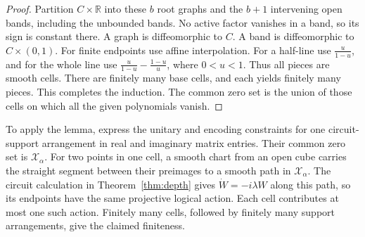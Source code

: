 \documentclass[aps,prl,reprint,notitlepage,nofootinbib,nobibnotes]{revtex4-2}
\begin{document}
\begin{proof}
Partition \(C\times\mathbb R\) into these \(b\) root graphs and the
\(b+1\) intervening open bands, including the unbounded bands.
No active factor vanishes in a band, so its sign is constant there.
A graph is diffeomorphic to \(C\). A band is diffeomorphic to
\(C\times(0,1)\). For finite endpoints use affine interpolation.
For a half-line use \(\frac{u}{1-u}\), and for the whole line use
\(\frac{u}{1-u}-\frac{1-u}{u}\), where \(0<u<1\).
Thus all pieces are smooth cells. There are finitely many base cells,
and each yields finitely many pieces. This completes the induction. The common zero set is the union of those cells on which
all the given polynomials vanish.
\end{proof}

To apply the lemma, express the unitary and encoding constraints
for one circuit-support arrangement in real and imaginary matrix
entries. Their common zero set is \(\mathcal X_\alpha\).
For two points in one cell, a smooth chart from an open cube carries
the straight segment between their preimages to a smooth path in
\(\mathcal X_\alpha\). The circuit calculation in Theorem~\ref{thm:depth}
gives \(\dot W=-i\lambda W\) along this path, so its endpoints have the
same projective logical action. Each cell contributes at most one such
action. Finitely many cells, followed by finitely many support
arrangements, give the claimed finiteness.
\end{document}
